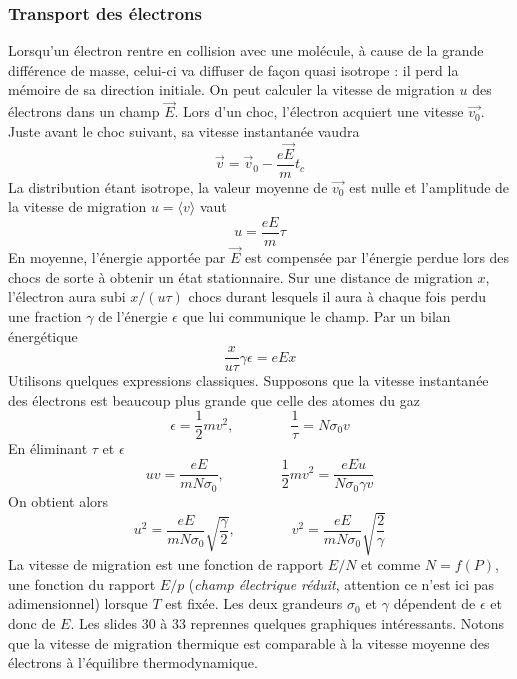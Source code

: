 		\subsubsection{Transport des électrons}
		Lorsqu'un électron rentre en collision avec une molécule, à cause de la grande différence de
		masse, celui-ci va diffuser de façon quasi isotrope : il perd la mémoire de sa direction 
		initiale. On peut calculer la vitesse de migration $u$ des électrons dans un champ $\vec E$. 
		Lors d'un choc, l'électron acquiert une vitesse $\vec{v_0}$. Juste avant le choc suivant, 
		sa vitesse instantanée vaudra
		\begin{equation}
		\overrightarrow{v}=\overrightarrow{v}_0-\frac{e\vec E}{m}t_c
		\end{equation}
		La distribution étant isotrope, la valeur moyenne de $\vec{v_0}$ est nulle et l'amplitude de
		la vitesse de migration $u=\langle v\rangle$ vaut
		\begin{equation}
		u=\frac{eE}{m}\tau
		\end{equation}
		En moyenne, l'énergie apportée par $\vec{E}$ est compensée par l'énergie perdue lors des
		chocs de sorte à obtenir un état stationnaire. Sur une distance de migration $x$, l'électron
		aura subi $x/(u\tau)$ chocs durant lesquels il aura à chaque fois perdu une fraction 
		$\gamma$ de l'énergie $\epsilon$ que lui communique le champ. Par un bilan énergétique
		\begin{equation}
		\frac{x}{u\tau}\gamma\epsilon=eEx
		\end{equation}
		Utilisons quelques expressions classiques. Supposons que la vitesse instantanée des 
		électrons est beaucoup plus grande que celle des atomes du gaz
		\begin{equation}
		\epsilon=\frac{1}{2}mv^2,\qquad\qquad\frac{1}{\tau}=N\sigma_0v
		\end{equation}
		En éliminant $\tau$ et $\epsilon$
		\begin{equation}
		uv=\frac{eE}{mN\sigma_0},\qquad\qquad\frac{1}{2}mv^2=\frac{eEu}{N\sigma_0\gamma v}
		\end{equation}
		On obtient alors
		\begin{equation}
		u^2=\frac{eE}{mN\sigma_0}\sqrt{\frac{\gamma}{2}},\qquad\qquad v^2=\frac{eE}{mN\sigma_0}
		\sqrt{\frac{2}{\gamma}}
		\end{equation}
		La vitesse de migration est une fonction de rapport $E/N$ et comme $N=f(P)$, une fonction
		du rapport $E/p$ (\textit{champ électrique réduit}, attention ce n'est ici pas 
		adimensionnel) lorsque $T$ est fixée. Les deux grandeurs $\sigma_0$ et $\gamma$ dépendent 
		de $\epsilon$ et donc de $E$. Les slides 30 à 33 reprennes quelques graphiques intéressants. 
		Notons que la vitesse de migration thermique est comparable à la vitesse moyenne des 
		électrons à l'équilibre thermodynamique.
		
